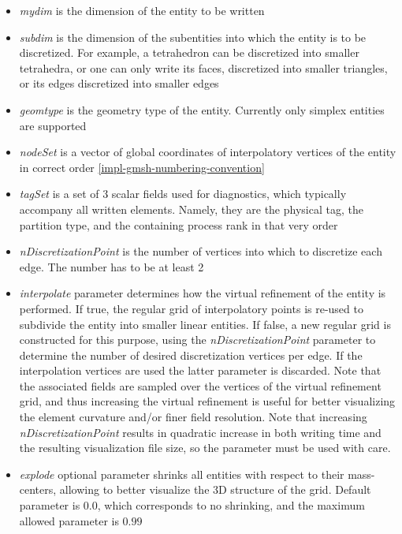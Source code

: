 \begin{itemize}  
  \item \textit{mydim} is the dimension of the entity to be written
  \item \textit{subdim} is the dimension of the subentities into which the entity is to be discretized. For example, a tetrahedron can be discretized into smaller tetrahedra, or one can only write its faces, discretized into smaller triangles, or its edges discretized into smaller edges
  \item \textit{geomtype} is the geometry type of the entity. Currently only simplex entities are supported
  \item \textit{nodeSet} is a vector of global coordinates of interpolatory vertices of the entity in correct order \ref{impl-gmsh-numbering-convention}
  \item \textit{tagSet} is a set of 3 scalar fields used for diagnostics, which typically accompany all written elements. Namely, they are the physical tag, the partition type, and the containing process rank in that very order
  \item \textit{nDiscretizationPoint} is the number of vertices into which to discretize each edge. The number has to be at least 2
  \item \textit{interpolate} parameter determines how the virtual refinement of the entity is performed. If true, the regular grid of interpolatory points is re-used to subdivide the entity into smaller linear entities. If false, a new regular grid is constructed for this purpose, using the \textit{nDiscretizationPoint} parameter to determine the number of desired discretization vertices per edge. If the interpolation vertices are used the latter parameter is discarded. Note that the associated fields are sampled over the vertices of the virtual refinement grid, and thus increasing the virtual refinement is useful for better visualizing the element curvature and/or finer field resolution. Note that increasing \textit{nDiscretizationPoint} results in quadratic increase in both writing time and the resulting visualization file size, so the parameter must be used with care.
  \item \textit{explode} optional parameter shrinks all entities with respect to their mass-centers, allowing to better visualize the 3D structure of the grid. Default parameter is $0.0$, which corresponds to no shrinking, and the maximum allowed parameter is $0.99$
\end{itemize}


